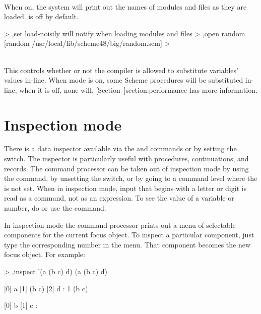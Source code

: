 \begin{description}
\item {}\\
    When on, the system will print out the names of modules and files
    as they are loaded.   is off by default.
\begin{example}
> ,set load-noisily
will notify when loading modules and files
> ,open random
[random /usr/local/lib/scheme48/big/random.scm]
> 
\end{example}

\item {}\\
This controls whether or not the compiler is allowed to substitute
 variables' values in-line.
When  mode is on,
some Scheme procedures will be substituted in-line; when it is off,
none will.
[Section~\Ref]{section:performance}
has more information.

\end{description}

\section{Inspection mode}
\label{inspector}

There is a data inspector available via the  and
  commands or by setting the  switch.
The inspector is particularly useful with procedures, continuations,
 and records.
The command processor can be taken out of inspection mode by
 using the  command, by unsetting the  switch,
 or by going to a command level where the  is not
 set.
When in inspection mode, input that begins with
  a letter or digit is read as a command, not as an expression.
To see the value of a variable or number, do 
  or use the  command.

In inspection mode the command processor prints out a
 menu of selectable components for the current focus object.
To inspect a particular component, just type the corresponding number in
 the menu.
That component becomes the new focus object.
For example:
\begin{example}
> ,inspect '(a (b c) d)
(a (b c) d)

[0] a
[1] (b c)
[2] d
: 1
(b c)

[0] b
[1] c
: 
\end{example}

